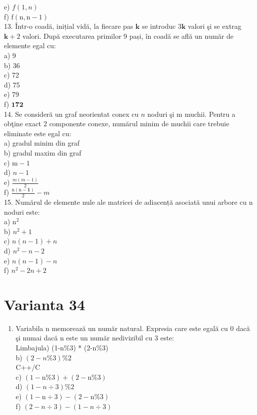 \documentclass[10pt]{article}
\begin{document}
e) $f(1, n)$\\
f) $\mathrm{f}(\mathrm{n}, \mathrm{n}-1)$\\
13. Într-o coadă, inițial vidă, la fiecare pas $\mathbf{k}$ se introduc $3 \mathbf{k}$ valori şi se extrag $\mathbf{k}+2$ valori. După executarea primilor 9 pași, în coadă se află un număr de elemente egal cu:\\
a) 9\\
b) 36\\
c) 72\\
d) 75\\
e) 79\\
f) $\mathbf{1 7 2}$\\
14. Se consideră un graf neorientat conex cu $n$ noduri şi m muchii. Pentru a obţine exact 2 componente conexe, numărul minim de muchii care trebuie eliminate este egal cu:\\
a) gradul minim din graf\\
b) gradul maxim din graf\\
c) $\mathrm{m}-1$\\
d) $n-1$\\
e) $\frac{m(m-1)}{2}$\\
f) $\frac{\mathrm{n}(\mathrm{n}-\mathbf{1})}{2}-m$\\
15. Numărul de elemente nule ale matricei de adiacență asociată unui arbore cu n noduri este:\\
a) $\mathrm{n}^{2}$\\
b) $n^{2}+1$\\
c) $n(n-1)+n$\\
d) $n^{2}-n-2$\\
e) $n(n-1)-n$\\
f) $n^{2}-2 n+2$

\section*{Varianta 34}
\begin{enumerate}
  \item Variabila n memorează un număr natural. Expresia care este egală cu 0 dacă şi numai dacă n este un număr nedivizibil cu 3 este:\\
Limbajula) (1-n\%3) * (2-n\%3)\\
b) $(2-n \% 3) \% 2$\\
C++/C\\
c) $(1-\mathrm{n} \% 3)+(2-\mathrm{n} \% 3)$\\
d) $(1-n \div 3) \% 2$\\
e) $(1-\mathrm{n} \div 3)-(2-\mathrm{n} \% 3)$\\
f) $(2-n \div 3)-(1-n \div 3)$
\end{enumerate}
\end{document}
